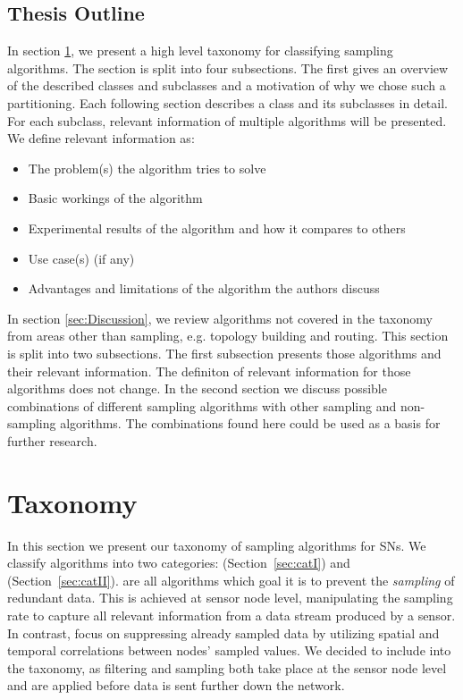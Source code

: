 \subsection{Thesis Outline}

  In section \ref{sec:Taxonomy}, we present a
high level taxonomy for classifying sampling algorithms. The section is split
into four subsections. The first gives an overview of the described classes and
subclasses and a motivation of why we chose such a partitioning. Each following
section describes a class and its subclasses in detail. For each subclass,
relevant information of multiple algorithms will be presented. We define
relevant information as:
\begin{itemize}
	\item The problem(s) the algorithm tries to solve
	\item Basic workings of the algorithm
	\item Experimental results of the algorithm and how it compares to others
	\item Use case(s) (if any)
	\item Advantages and limitations of the algorithm the authors discuss
\end{itemize}

 In section \ref{sec:Discussion}, we review
algorithms not covered in the taxonomy from areas other than sampling, e.g.
topology building and routing. This section is split into two subsections. The
first subsection presents those algorithms and their relevant information. The
definiton of relevant information for those algorithms does not change. In the
second section we discuss possible combinations of different sampling
algorithms with other sampling and non-sampling algorithms. The combinations
found here could be used as a basis for further research.


\section{Taxonomy}
\label{sec:Taxonomy}

In this section we present our taxonomy of sampling algorithms for \acp{SN}. We
classify algorithms into two categories: \catI (Section~\ref{sec:catI}) and
\catII (Section~\ref{sec:catII}). %
\catI are all algorithms which goal it is to prevent the \textit{sampling}
of redundant data. This is achieved at sensor node level, manipulating the
sampling rate to capture all relevant information from a data stream produced
by a sensor. In contrast, \catII focus on suppressing already sampled data by
utilizing spatial and temporal correlations between nodes' sampled values. We
decided to include \catII into the taxonomy, as filtering and sampling both
take place at the sensor node level and are applied before data is sent further
down the network.  %

